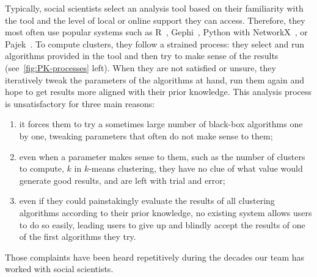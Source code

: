 Typically, social scientists select an analysis tool based on their familiarity with the tool and the level of local or online support they can access.
Therefore, they most often use popular systems such as R~\cite{Rstat}, Gephi~\cite{Gephi}, Python with NetworkX~\cite{networkx}, or Pajek~\cite{pajek}.
To compute clusters, they follow a strained process: they select and run algorithms provided in the tool and then try to make sense of the results (see~\autoref{fig:PK-processes} left).
When they are not satisfied or unsure, they iteratively tweak the parameters of the algorithms at hand, run them again and hope to get results more aligned with their prior knowledge. This analysis process is unsatisfactory for three main reasons:
\begin{enumerate}
    \item it forces them to try a sometimes large number of black-box algorithms one by one, tweaking parameters that often do not make sense to them; \item even when a parameter makes sense to them, such as the number of clusters to compute, $k$ in $k$-means clustering, they have no clue of what value would generate good results, and are left with trial and error;
    \item even if they could %
    painstakingly evaluate the results of all clustering algorithms  according to their prior knowledge, no existing system allows users to do so easily, leading users to give up and blindly accept the results of one of the first algorithms they try.
\end{enumerate}
Those complaints have been heard repetitively during the decades our team has worked with social scientists.



